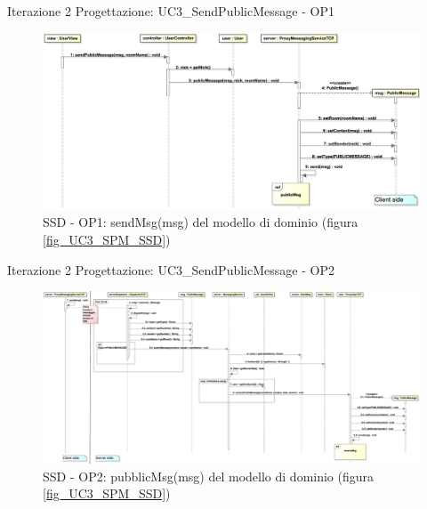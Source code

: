 \documentclass[t]{beamer} %
\begin{document}
\begin{frame} {Iterazione 2 Progettazione: UC3\_SendPublicMessage - OP1}
   \begin{figure}
     \includegraphics[scale=0.24]{image_astah/Iteration_2_DesignModel/UC3_SendPublicMessage_SSD_1_sendMsg.png}{\centering}
     \caption{SSD - OP1: sendMsg(msg) del modello di dominio (figura \ref{fig_UC3_SPM_SSD}) }
     \label{fig_UC3_SSD_SRM_1} 
   \end{figure}
\end{frame}

\begin{frame} {Iterazione 2 Progettazione: UC3\_SendPublicMessage - OP2}
   \begin{figure}
     \includegraphics[scale=0.14]{image_astah/Iteration_2_DesignModel/UC3_SendPublicMessage_SSD_2_publicMsg.png}{\centering}
     \caption{SSD - OP2: pubblicMsg(msg) del modello di dominio (figura \ref{fig_UC3_SPM_SSD}) }
     \label{fig_UC3_SSD_SRM_2} 
   \end{figure}
\end{frame}
\end{document}
